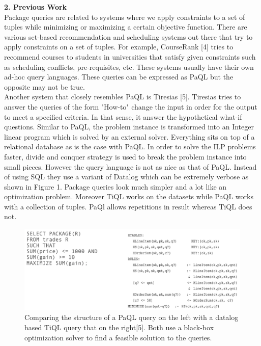 \documentclass[a4paper,12pt]{article}
\begin{document}
\vspace{5mm}
\textbf{2. Previous Work}
\\

Package queries are related to systems where we apply constraints to a set of tuples while minimizing or maximizing a certain objective function. There are various set-based recommendation and scheduling systems out there that try to apply constraints on a set of tuples. For example, CourseRank [4] tries to recommend courses to students in universities that satisfy given constraints such as scheduling conflicts, pre-requisites, etc. These systems usually have their own ad-hoc query languages. These queries can be expressed as PaQL but the opposite may not be true.
\\
Another system that closely resembles PaQL is Tiresias [5]. Tiresias tries to answer the queries of the form "How-to" change the input in order for the output to meet a specified criteria. In that sense, it answer the hypothetical what-if questions. Similar to PaQL, the problem instance is transformed into an Integer linear program which is solved by an external solver. Everything sits on top of a relational database as is the case with PaQL. In order to solve the ILP problems faster, divide and conquer strategy is used to break the problem instance into small pieces. However the query language is not as nice as that of PaQL. Instead of using SQL they use a variant of Datalog which can be extremely verbose as shown in Figure 1. Package queries look much simpler and a lot like an optimization problem. Moreover TiQL works on the datasets while PaQL works with a collection of tuples. PaQl allows repetitions in result whereas TiQL does not. \\
\begin{figure}[h]
\includegraphics[scale=.7]{1}
\caption{Comparing the structure of a PaQL query on the left with a datalog based TiQL query that on the right[5]. Both use a black-box optimization solver to find a feasible solution to the queries.}
\centering
\end{figure}
\end{document}
